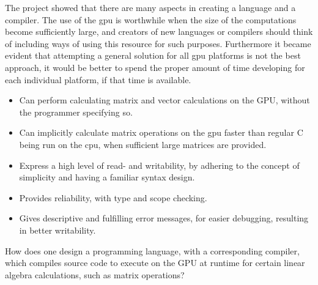 The project showed that there are many aspects in creating a language and a compiler.
The use of the \acrshort{gpu} is worthwhile when the size of the computations become sufficiently large, and creators of new languages or compilers should think of including ways of using this resource for such purposes.
Furthermore it became evident that attempting a general solution for all \acrshort{gpu} platforms is not the best approach, it would be better to spend the proper amount of time developing for each individual platform, if that time is available.


\begin{itemize}
	\item Can perform calculating matrix and vector calculations on the GPU, without the programmer specifying so.
	\item Can implicitly calculate matrix operations on the \acrshort{gpu} faster than regular C being run on the \acrshort{cpu}, when sufficient large matrices are provided.
	\item Express a high level of read- and writability, by adhering to the concept of simplicity and having a familiar syntax design.
	\item Provides reliability, with type and scope checking.
	\item Gives descriptive and fulfilling error messages, for easier debugging, resulting in better writability.
\end{itemize}

How does one design a programming language, with a corresponding compiler, which compiles
source code to execute on the GPU at runtime for certain linear algebra calculations, such as matrix operations?